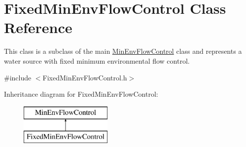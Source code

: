 \hypertarget{classFixedMinEnvFlowControl}{}\section{Fixed\+Min\+Env\+Flow\+Control Class Reference}
\label{classFixedMinEnvFlowControl}


This class is a subclass of the main {\ttfamily \mbox{\hyperlink{classMinEnvFlowControl}{Min\+Env\+Flow\+Control}}} class and represents a water source with fixed minimum environmental flow control.  




{\ttfamily \#include $<$Fixed\+Min\+Env\+Flow\+Control.\+h$>$}

Inheritance diagram for Fixed\+Min\+Env\+Flow\+Control\+:\begin{figure}[H]
\begin{center}
\leavevmode
\includegraphics[height=2.000000cm]{classFixedMinEnvFlowControl}
\end{center}
\end{figure}

